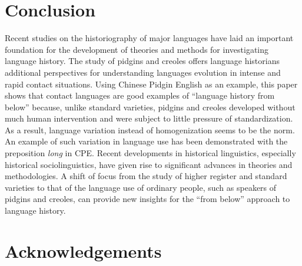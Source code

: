\documentclass[output=paper]{langsci/langscibook}
\begin{document}
\section{Conclusion}

Recent studies on the historiography of major languages have laid an important foundation for the development of theories and methods for investigating language history. The study of pidgins and creoles offers language historians additional perspectives for understanding languages evolution in intense and rapid contact situations. Using Chinese Pidgin English as an example, this paper shows that contact languages are good examples of “language history from below” because, unlike standard varieties, pidgins and creoles developed without much human intervention and were subject to little pressure of standardization. As a result, language variation instead of homogenization seems to be the norm. An example of such variation in language use has been demonstrated with the preposition \textit{long} in CPE. Recent developments in historical linguistics, especially historical sociolinguistics, have given rise to significant advances in theories and methodologies. A shift of focus from the study of higher register and standard varieties to that of the language use of ordinary people, such as speakers of pidgins and creoles, can provide new insights for the “from below” approach to language history.


\section*{Acknowledgements}


{\sloppy\printbibliography[heading=subbibliography,notkeyword=this]}
\end{document}
